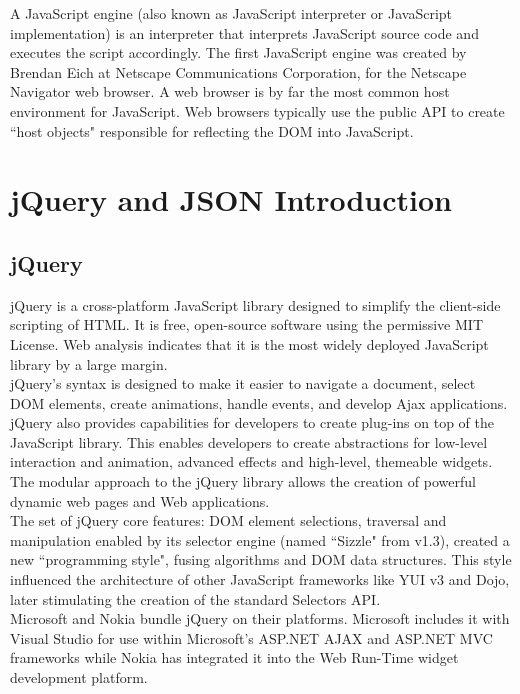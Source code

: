 \documentclass[12pt,a4 paper]{report}
\begin{document}
A JavaScript engine (also known as JavaScript interpreter or JavaScript implementation) is an interpreter that interprets JavaScript source code and executes the script accordingly. The first JavaScript engine was created by Brendan Eich at Netscape Communications Corporation, for the Netscape Navigator web browser. A web browser is by far the most common host 
environment for JavaScript. Web browsers typically use the public API to create ``host objects" responsible for reflecting the DOM into JavaScript.

\section{jQuery and JSON Introduction}

\subsection{jQuery}
jQuery is a cross-platform JavaScript library designed to simplify the client-side scripting of HTML. It is free, open-source software using the permissive MIT License. Web analysis indicates that it is the most widely deployed JavaScript library by a large margin. \\

jQuery's syntax is designed to make it easier to navigate a document, select DOM elements, create animations, handle events, and develop Ajax applications. jQuery also provides capabilities for developers to create plug-ins on top of the JavaScript library. This enables developers to create abstractions for low-level interaction and animation, advanced effects and high-level, themeable widgets. The modular approach to the jQuery library allows the creation of powerful dynamic web pages and Web applications. \\

The set of jQuery core features: DOM element selections, traversal and manipulation enabled by its selector engine (named ``Sizzle" from v1.3), created a new ``programming style", fusing algorithms and DOM data structures. This style influenced the architecture of other JavaScript frameworks like YUI v3 and Dojo, later stimulating the creation of the standard Selectors API. \\

Microsoft and Nokia bundle jQuery on their platforms. Microsoft includes it with Visual Studio for use within Microsoft's ASP.NET AJAX and ASP.NET MVC frameworks while Nokia has integrated it into the Web Run-Time widget development platform.
\end{document}

